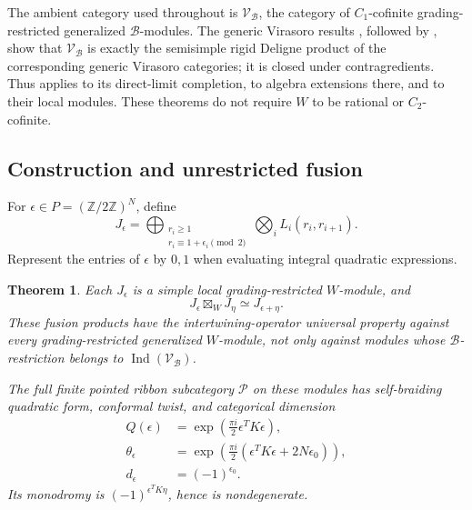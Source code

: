 \documentclass[11pt,a4paper]{article}
\numberwithin{equation}{section}
\newtheorem{theorem}{Theorem}[section]
\theoremstyle{definition}\newtheorem{definition}[theorem]{Definition}
\theoremstyle{remark}\newtheorem{remark}[theorem]{Remark}
\newcommand{\Ind}{\operatorname{Ind}}\newcommand{\Irr}{\operatorname{Irr}}
\newcommand{\bo}{\boxtimes}\newcommand{\Cat}{\mathcal C}
\begin{document}
The ambient category used throughout is
$\mathscr V_{\mathcal B}$, the category of $C_1$-cofinite grading-restricted
generalized $\mathcal B$-modules. The generic Virasoro results
\cite[Theorems 3.1.4,4.2.6,5.1.2,5.5.3]{virasoro}, followed by
\cite[Theorem 1.2, equivalently Theorem 4.13]{c:McRaeDeligne}, show that
$\mathscr V_{\mathcal B}$ is exactly the semisimple rigid Deligne product of the
corresponding generic Virasoro categories; it is closed under contragredients.
Thus \cite[Theorems 7.1,7.5,7.7]{cmy} applies to its direct-limit completion,
to algebra extensions there, and to their local modules. These theorems do
not require $W$ to be rational or $C_2$-cofinite.

\subsection{Construction and unrestricted fusion}
For $\epsilon\in P=(\mathbb Z/2\mathbb Z)^N$, define
\[
 J_\epsilon=\bigoplus_{\substack{r_i\geq1\\
                         r_i\equiv1+\epsilon_i\pmod2}}
                  \bigotimes_iL_i(r_i,r_{i+1}).
\]
Represent the entries of $\epsilon$ by $0,1$ when evaluating integral
quadratic expressions.

\begin{theorem}\label{c:currents}
Each $J_\epsilon$ is a simple local grading-restricted $W$-module, and
\[
 J_\epsilon\bo_W J_\eta\simeq J_{\epsilon+\eta}.
\]
These fusion products have the intertwining-operator universal property
against every grading-restricted generalized $W$-module, not only against
modules whose $\mathcal B$-restriction belongs to $\Ind(\mathscr V_{\mathcal B})$.

The full finite pointed ribbon subcategory $\mathcal P$ on these modules has
self-braiding quadratic form, conformal twist, and categorical dimension
\begin{align*}
 Q(\epsilon)&=\exp\left(\frac{\pi i}{2}\epsilon^TK\epsilon\right),\\
 \theta_\epsilon&=\exp\left(\frac{\pi i}{2}
                    (\epsilon^TK\epsilon+2N\epsilon_0)\right),\\
 d_\epsilon&=(-1)^{\epsilon_0}.
\end{align*}
Its monodromy is $(-1)^{\epsilon^TK\eta}$, hence is nondegenerate.
\end{theorem}
\end{document}
